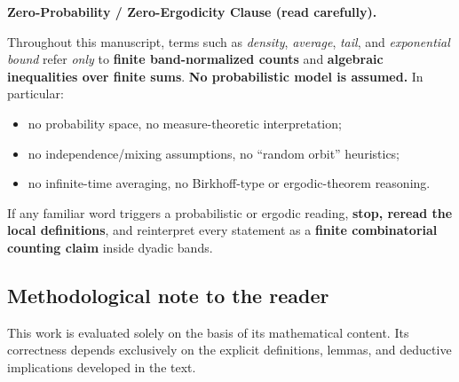 \documentclass[preprint,12pt]{elsarticle}
\begin{document}

\noindent\textbf{Zero-Probability / Zero-Ergodicity Clause (read carefully).}\par
\noindent Throughout this manuscript, terms such as \emph{density}, \emph{average}, \emph{tail}, and \emph{exponential bound}
refer \emph{only} to \textbf{finite band-normalized counts} and \textbf{algebraic inequalities over finite sums}.
\textbf{No probabilistic model is assumed.} In particular:
\begin{itemize}
  \item no probability space, no measure-theoretic interpretation;
  \item no independence/mixing assumptions, no “random orbit” heuristics;
  \item no infinite-time averaging, no Birkhoff-type or ergodic-theorem reasoning.
\end{itemize}
\noindent
If any familiar word triggers a probabilistic or ergodic reading, \textbf{stop, reread the local definitions},
and reinterpret every statement as a \textbf{finite combinatorial counting claim} inside dyadic bands.

\begin{center}
\end{center}
\vspace{1cm}

\subsection*{Methodological note to the reader}

This work is evaluated solely on the basis of its mathematical content.
Its correctness depends exclusively on the explicit definitions, lemmas,
and deductive implications developed in the text.
\end{document}
